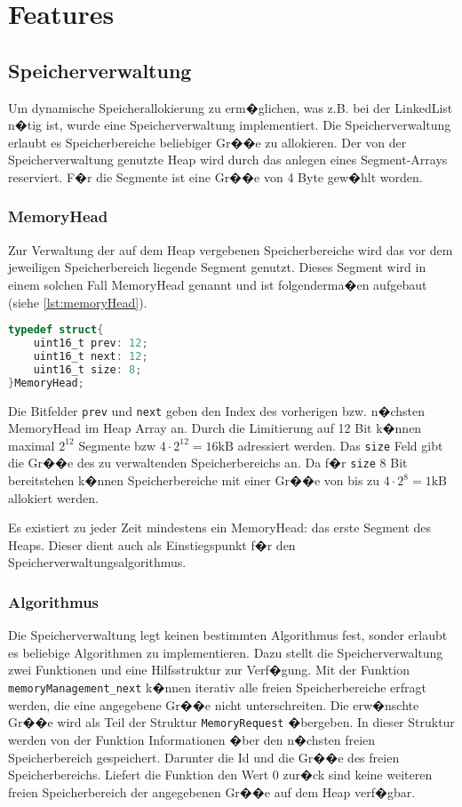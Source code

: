 \chapter{Features}

\section{Speicherverwaltung}
Um dynamische Speicherallokierung zu erm�glichen, was z.B. 
bei der LinkedList n�tig ist, wurde eine Speicherverwaltung implementiert.
Die Speicherverwaltung erlaubt es Speicherbereiche beliebiger Gr��e zu allokieren.
Der von der Speicherverwaltung genutzte Heap wird durch das anlegen eines Segment-Arrays reserviert.
F�r die Segmente ist eine Gr��e von 4 Byte gew�hlt worden.

\subsection{MemoryHead}
Zur Verwaltung der auf dem Heap vergebenen Speicherbereiche wird das vor dem jeweiligen Speicherbereich liegende Segment genutzt.
Dieses Segment wird in einem solchen Fall MemoryHead genannt und ist folgenderma�en aufgebaut (siehe \ref{lst:memoryHead}).

\begin{lstlisting}[language=C, label=lst:memoryHead, caption=MemoryHead Struct]
typedef struct{
	uint16_t prev: 12;
	uint16_t next: 12;
	uint16_t size: 8;
}MemoryHead;
\end{lstlisting}

Die Bitfelder \texttt{prev} und \texttt{next} geben den Index des vorherigen bzw. n�chsten MemoryHead im Heap Array an.
Durch die Limitierung auf 12 Bit k�nnen maximal $2^{12}$ Segmente bzw $4\cdot2^{12} = 16\text{kB}$ adressiert werden.
Das \texttt{size} Feld gibt die Gr��e des zu verwaltenden Speicherbereichs an.
Da f�r \texttt{size} 8 Bit bereitstehen k�nnen Speicherbereiche mit einer Gr��e von bis zu $4\cdot2^8 = 1\text{kB}$ allokiert werden.

Es existiert zu jeder Zeit mindestens ein MemoryHead: das erste Segment des Heaps.
Dieser dient auch als Einstiegspunkt f�r den Speicherverwaltungsalgorithmus.

\subsection{Algorithmus}
Die Speicherverwaltung legt keinen bestimmten Algorithmus fest, sonder erlaubt es beliebige Algorithmen zu implementieren.
Dazu stellt die Speicherverwaltung zwei Funktionen und eine Hilfsstruktur zur Verf�gung.
Mit der Funktion \texttt{memoryManagement\_next} k�nnen iterativ alle freien Speicherbereiche erfragt werden, die eine angegebene Gr��e nicht unterschreiten.
Die erw�nschte Gr��e wird als Teil der Struktur \texttt{MemoryRequest} �bergeben.
In dieser Struktur werden von der Funktion Informationen �ber den n�chsten freien Speicherbereich gespeichert.
Darunter die Id und die Gr��e des freien Speicherbereichs.
Liefert die Funktion den Wert 0 zur�ck sind keine weiteren freien Speicherbereich der angegebenen Gr��e auf dem Heap verf�gbar.

